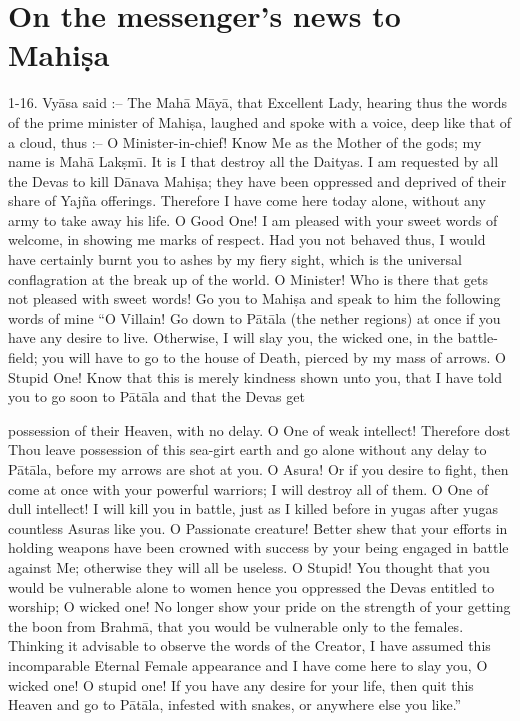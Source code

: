 \chapter{On the messenger's news to Mahi\d{s}a}

1-16. Vy\=asa said :-- The Mah\=a M\=ay\=a, that Excellent Lady, hearing thus the words of the prime minister of Mahi\d{s}a, laughed and spoke with a voice, deep like that of a cloud, thus :-- O Minister-in-chief! Know Me as the Mother of the gods; my name is Mah\=a Lak\d{s}m\={\i}. It is I that destroy all the Daityas. I am requested by all the Devas to kill D\=anava Mahi\d{s}a; they have been oppressed and deprived of their share of Yaj\~na offerings. Therefore I have come here today alone, without any army to take away his life. O Good One! I am pleased with your sweet words of welcome, in showing me marks of respect. Had you not behaved thus, I would have certainly burnt you to ashes by my fiery sight, which is the universal conflagration at the break up of the world. O Minister! Who is there that gets not pleased with sweet words! Go you to Mahi\d{s}a and speak to him the following words of mine ``O Villain! Go down to P\=at\=ala (the nether regions) at once if you have any desire to live. Otherwise, I will slay you, the wicked one, in the battle-field; you will have to go to the house of Death, pierced by my mass of arrows. O Stupid One! Know that this is merely kindness shown unto you, that I have told you to go soon to P\=at\=ala and that the Devas get

possession of their Heaven, with no delay. O One of weak intellect! Therefore dost Thou leave possession of this sea-girt earth and go alone without any delay to P\=at\=ala, before my arrows are shot at you. O Asura! Or if you desire to fight, then come at once with your powerful warriors; I will destroy all of them. O One of dull intellect! I will kill you in battle, just as I killed before in yugas after yugas countless Asuras like you. O Passionate creature! Better shew that your efforts in holding weapons have been crowned with success by your being engaged in battle against Me; otherwise they will all be useless. O Stupid! You thought that you would be vulnerable alone to women hence you oppressed the Devas entitled to worship; O wicked one! No longer show your pride on the strength of your getting the boon from Brahm\=a, that you would be vulnerable only to the females. Thinking it advisable to observe the words of the Creator, I have assumed this incomparable Eternal Female appearance and I have come here to slay you, O wicked one! O stupid one! If you have any desire for your life, then quit this Heaven and go to P\=at\=ala, infested with snakes, or anywhere else you like.''

